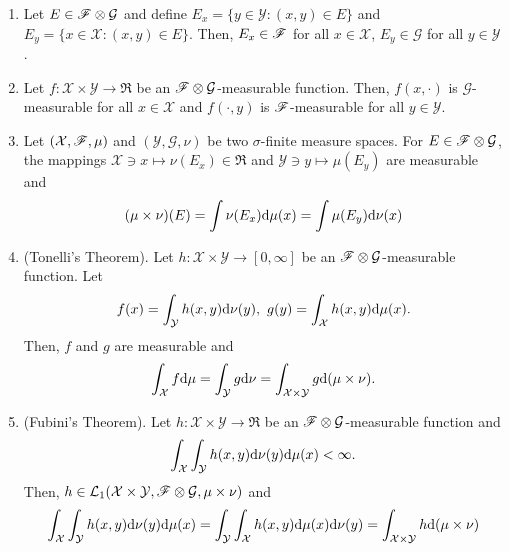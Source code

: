 \documentclass[a4paper,10pt]{article}
\begin{document}
\begin{enumerate}
 \item Let $E\in \mathscr{F}\otimes\mathcal{G}$ and define 
       $E_x = \{y\in \mathcal{Y}: (x,y)\in E\}$ and $E_y = \{x\in \mathcal{X}: (x,y)\in E\}$.
       Then, $E_x\in \mathscr{F}$ for all $x\in\mathcal{X}$, $E_y\in\mathcal{G}$ for all $y\in\mathcal{Y}$.
 \item Let $f:\mathcal{X}\times\mathcal{Y}\to \Re$ be an $\mathscr{F}\otimes \mathcal{G}$-measurable function.
       Then, $f(x,\cdot)$ is $\mathcal{G}$-measurable for all $x\in\mathcal{X}$ and 
       $f(\cdot, y)$ is $\mathscr{F}$-measurable for all $y\in\mathcal{Y}$.
 \item Let $(\mathcal{X},\mathscr{F},\mu)$ and $(\mathcal{Y},\mathcal{G},\nu)$ be two $\sigma$-finite measure spaces.
       For $E\in\mathscr{F}\otimes\mathcal{G}$, the mappings $\mathcal{X}\ni x\mapsto \nu(E_x) \in \Re$ and 
       $\mathcal{Y}\ni y\mapsto \mu(E_y)$ are measurable and
       \[
        (\mu\times \nu)(E) = \int \nu(E_x)\mathrm{d} \mu(x) = \int \mu(E_y)\mathrm{d} \nu(x)
       \]
 \item (Tonelli's Theorem). Let $h:\mathcal{X}\times \mathcal{Y}\to[0,\infty]$ be an $\mathscr{F}\otimes\mathcal{G}$-measurable
       function. Let
       \[
        f(x) = \int_{\mathcal{Y}} h(x,y) \mathrm{d}\nu(y), \ g(y) = \int_{\mathcal{X}}h(x,y)\mathrm{d}\mu(x).
       \]
       Then, $f$ and $g$ are measurable and 
       \[
        \int_{\mathcal{X}}f\mathrm{d}\mu = \int_{\mathcal{Y}}g\mathrm{d}\nu = \int_{\mathcal{X}\times\mathcal{Y}}g\mathrm{d}(\mu\times \nu).
       \]
 \item (Fubini's Theorem). 
       Let $h:\mathcal{X}\times \mathcal{Y}\to \Re$ be an $\mathscr{F}\otimes\mathcal{G}$-measurable
       function and
       \[
        \int_{\mathcal{X}} \int_{\mathcal{Y}} h(x,y)\mathrm{d}\nu(y) \mathrm{d}\mu(x) < \infty.
       \]
       Then, $h\in\mathcal{L}_1(\mathcal{X}\times\mathcal{Y}, \mathscr{F}\otimes\mathcal{G}, \mu\times\nu)$ and
        \[
        \int_{\mathcal{X}} \int_{\mathcal{Y}} h(x,y)\mathrm{d}\nu(y) \mathrm{d}\mu(x) = 
        \int_{\mathcal{Y}} \int_{\mathcal{X}} h(x,y)\mathrm{d}\mu(x) \mathrm{d}\nu(y) = 
        \int_{\mathcal{X}\times\mathcal{Y}} h \mathrm{d}(\mu\times \nu)
       \]
\end{enumerate}
\end{document}
